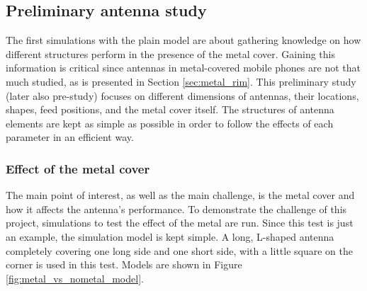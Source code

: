 \subsection{Preliminary antenna study}
\label{sec:pre_study}
The first simulations with the plain model are about gathering knowledge on how different structures perform in the presence of the metal cover. Gaining this information is critical since antennas in metal-covered mobile phones are not that much studied, as is presented in Section \ref{sec:metal_rim}. This preliminary study (later also pre-study) focuses on different dimensions of antennas, their locations, shapes, feed positions, and the metal cover itself. The structures of antenna elements are kept as simple as possible in order to follow the effects of each parameter in an efficient way. 


\subsubsection{Effect of the metal cover}
\label{sec:metal_effect}
The main point of interest, as well as the main challenge, is the metal cover and how it affects the antenna's performance. To demonstrate the challenge of this project, simulations to test the effect of the metal are run. Since this test is just an example, the simulation model is kept simple. A long, L-shaped antenna completely covering one long side and one short side, with a little square on the corner is used in this test. Models are shown in Figure \ref{fig:metal_vs_nometal_model}.

